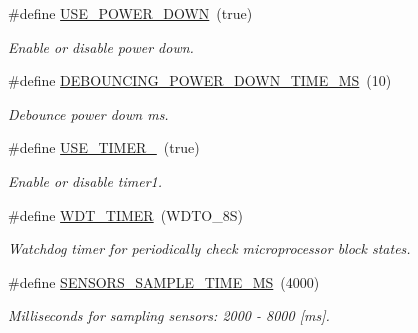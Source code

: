 \begin{DoxyCompactItemize}
\mbox{\label{i2c-th-config_8h_a9ace81994cbeb6153f9dd5adf0e6dbee}} 
\#define \hyperlink{i2c-th-config_8h_a9ace81994cbeb6153f9dd5adf0e6dbee}{U\+S\+E\+\_\+\+P\+O\+W\+E\+R\+\_\+\+D\+O\+WN}~(true)
\begin{DoxyCompactList}\small\item\em Enable or disable power down. \end{DoxyCompactList}\item 
\mbox{\label{i2c-th-config_8h_a7b9497e328b8f872cd7677cfd02bbf65}} 
\#define \hyperlink{i2c-th-config_8h_a7b9497e328b8f872cd7677cfd02bbf65}{D\+E\+B\+O\+U\+N\+C\+I\+N\+G\+\_\+\+P\+O\+W\+E\+R\+\_\+\+D\+O\+W\+N\+\_\+\+T\+I\+M\+E\+\_\+\+MS}~(10)
\begin{DoxyCompactList}\small\item\em Debounce power down ms. \end{DoxyCompactList}\item 
\mbox{\label{i2c-th-config_8h_a8051c2a569a9f9c488af89bce47ec306}} 
\#define \hyperlink{i2c-th-config_8h_a8051c2a569a9f9c488af89bce47ec306}{U\+S\+E\+\_\+\+T\+I\+M\+E\+R\+\_}~(true)
\begin{DoxyCompactList}\small\item\em Enable or disable timer1. \end{DoxyCompactList}\item 
\#define \hyperlink{i2c-th-config_8h_a983c9777673ee873f12ec9f489215321}{W\+D\+T\+\_\+\+T\+I\+M\+ER}~(W\+D\+T\+O\+\_\+8S)
\begin{DoxyCompactList}\small\item\em Watchdog timer for periodically check microprocessor block states. \end{DoxyCompactList}\item 
\mbox{\label{i2c-th-config_8h_a94909b75c6bbb3614c483f1d22462440}} 
\#define \hyperlink{i2c-th-config_8h_a94909b75c6bbb3614c483f1d22462440}{S\+E\+N\+S\+O\+R\+S\+\_\+\+S\+A\+M\+P\+L\+E\+\_\+\+T\+I\+M\+E\+\_\+\+MS}~(4000)
\begin{DoxyCompactList}\small\item\em Milliseconds for sampling sensors\+: 2000 -\/ 8000 \mbox{[}ms\mbox{]}. \end{DoxyCompactList}\item 
\mbox{\label{i2c-th-config_8h_a05567a696548b4a2e03c49dc893a32c8}} 

\end{DoxyCompactItemize}
